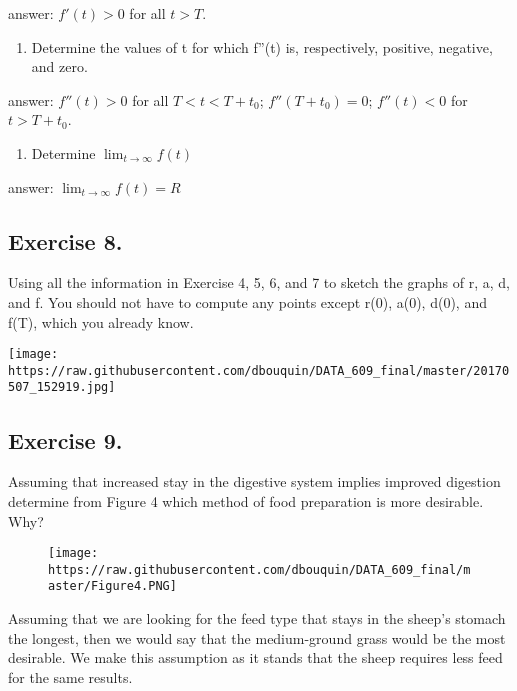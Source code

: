 \documentclass[]{article}
\providecommand{\tightlist}{%
  \setlength{\itemsep}{0pt}\setlength{\parskip}{0pt}}
\begin{document}
answer: \(f'(t) > 0\) for all \(t > T\).

\begin{enumerate}
\def\labelenumi{(\alph{enumi})}
\setcounter{enumi}{1}
\tightlist
\item
  Determine the values of t for which f''(t) is, respectively, positive,
  negative, and zero.
\end{enumerate}

answer: \(f''(t) > 0\) for all \(T < t < T + t_0\); \(f''(T + t_0) =0\);
\(f''(t) < 0\) for \(t > T + t_0\).

\begin{enumerate}
\def\labelenumi{(\alph{enumi})}
\setcounter{enumi}{2}
\tightlist
\item
  Determine \(\lim_{t\to\infty}f(t)\)
\end{enumerate}

answer: \(\lim_{t\to\infty}f(t) =R\)

\subsection{Exercise 8.}\label{exercise-8.}

Using all the information in Exercise 4, 5, 6, and 7 to sketch the
graphs of r, a, d, and f. You should not have to compute any points
except r(0), a(0), d(0), and f(T), which you already know.

\texttt{[image: https://raw.githubusercontent.com/dbouquin/DATA\_609\_final/master/20170507\_152919.jpg]}
\newpage

\subsection{Exercise 9.}\label{exercise-9.}

Assuming that increased stay in the digestive system implies improved
digestion determine from Figure 4 which method of food preparation is
more desirable. Why?

\begin{figure}[htbp]
\centering
\texttt{[image: https://raw.githubusercontent.com/dbouquin/DATA\_609\_final/master/Figure4.PNG]}
\caption{}
\end{figure}

Assuming that we are looking for the feed type that stays in the sheep's
stomach the longest, then we would say that the medium-ground grass
would be the most desirable. We make this assumption as it stands that
the sheep requires less feed for the same results.
\end{document}
